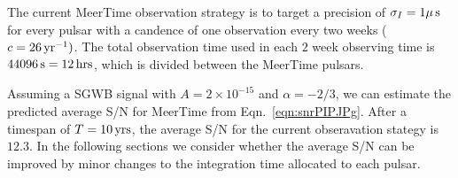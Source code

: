 The current MeerTime observation strategy is to target a precision of $\sigma_I = 1 {\rm \mu\, s}$ for every pulsar with a candence of one observation every two weeks ($c=26\,{\rm yr}^{-1})$.  
The total observation time used in each $2$ week observing time is $44096\,{\rm s} = 12\,{\rm hrs}$, which is divided between the MeerTime pulsars. 

Assuming a SGWB signal with $A = 2\times 10^{-15}$ and $\alpha = -2/3$, we can estimate the predicted average S/N for MeerTime from Eqn.~\ref{eqn:snrPIPJPg}. 
After a timespan of $T=10\,{\rm yrs}$, the average S/N for the current obseravation stategy is $12.3$.
In the following sections we consider whether the average S/N can be improved by minor changes to the integration time allocated to each pulsar. 



